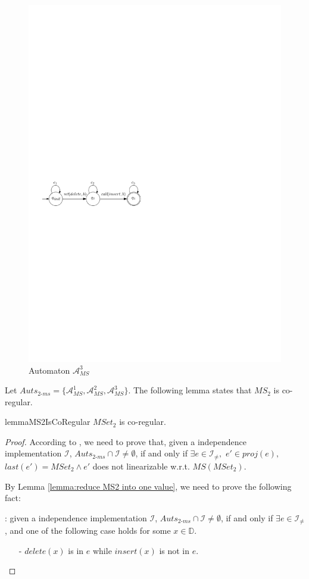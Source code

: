 {\begin{figure}[htbp]
  \centering
  \includegraphics[width=0.6 \textwidth]{figures/PIC_AUTO_MS_3.pdf}
  \caption{Automaton $\mathcal{A}_{\textit{MS}}^3$}
  \label{fig:automata 3 for MS-2 in appendix}
\end{figure}


Let $\textit{Auts}_{\textit{2-ms}} = \{ \mathcal{A}_{\textit{MS}}^1, \mathcal{A}_{\textit{MS}}^2, \mathcal{A}_{\textit{MS}}^3 \}$. The following lemma states that $\textit{MS}_2$ is co-regular.


\begin{restatable}{lemma}{MS2IsCoRegular}
\label{lemma:MS2 is co-regular}
$\textit{MSet}_2$ is co-regular.
\end{restatable}

\begin {proof}

According to \cite{Bouajjani:2015}, we need to prove that, given a independence implementation $\mathcal{I}$, $\textit{Auts}_{\textit{2-ms}} \cap \mathcal{I} \neq \emptyset$, if and only if $\exists e \in \mathcal{I}_{\neq},$ $e' \in \textit{proj}(e),$ $\textit{last}(e') = \textit{MSet}_2 \wedge e'$ does not linearizable w.r.t. $\textit{MS}(\textit{MSet}_2)$.

By Lemma \ref{lemma:reduce MS2 into one value}, we need to prove the following fact:

: given a independence implementation $\mathcal{I}$, $\textit{Auts}_{\textit{2-ms}} \cap \mathcal{I} \neq \emptyset$, if and only if $\exists e \in \mathcal{I}_{\neq}$, and one of the following case holds for some $x \in \mathbb{D}$.
\begin{itemize}
\setlength{\itemsep}{0.5pt}
\item[-] $\textit{delete}(x)$ is in $e$ while $\textit{insert}(x)$ is not in $e$.


\end{itemize}
\end{proof}}
